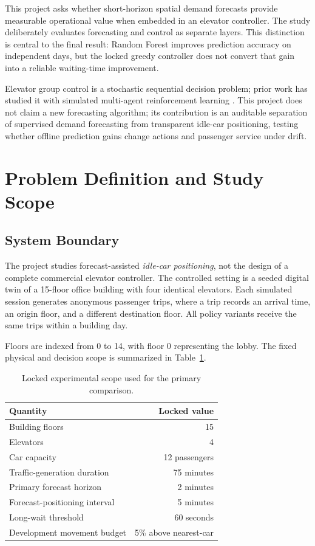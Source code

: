 \documentclass[12pt]{article}
\begin{document}
This project asks whether short-horizon spatial demand forecasts provide
measurable operational value when embedded in an elevator controller. The
study deliberately evaluates forecasting and control as separate layers. This
distinction is central to the final result: Random Forest improves prediction
accuracy on independent days, but the locked greedy controller does not convert
that gain into a reliable waiting-time improvement.

Elevator group control is a stochastic sequential decision problem; prior work
has studied it with simulated multi-agent reinforcement learning
\cite{crites1998elevator}. This project does not claim a new forecasting
algorithm; its contribution is an auditable separation of supervised demand
forecasting from transparent idle-car positioning, testing whether offline
prediction gains change actions and passenger service under drift.

\section{Problem Definition and Study Scope}
\label{sec:problem-definition}

\subsection{System Boundary}

The project studies forecast-assisted \emph{idle-car positioning}, not the
design of a complete commercial elevator controller. The controlled setting is
a seeded digital twin of a 15-floor office building with four identical
elevators. Each simulated session generates anonymous passenger trips, where a
trip records an arrival time, an origin floor, and a different destination
floor. All policy variants receive the same trips within a building day.

Floors are indexed from 0 to 14, with floor 0 representing the lobby. The
fixed physical and decision scope is summarized in
Table~\ref{tab:locked-scope}.

\begin{table}[H]
  \centering
  \caption{Locked experimental scope used for the primary comparison.}
  \label{tab:locked-scope}
  \begin{tabular}{@{}lr@{}}
    \toprule
    Quantity & Locked value \\
    \midrule
    Building floors & 15 \\
    Elevators & 4 \\
    Car capacity & 12 passengers \\
    Traffic-generation duration & 75 minutes \\
    Primary forecast horizon & 2 minutes \\
    Forecast-positioning interval & 5 minutes \\
    Long-wait threshold & 60 seconds \\
    Development movement budget & 5\% above nearest-car \\
    \bottomrule
\end{tabular}
\end{table}
\end{document}
